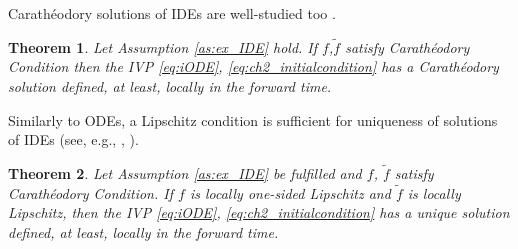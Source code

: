 \documentclass{article}
\newtheorem{theorem}{Theorem}
\begin{document}
Carath\'{e}odory solutions of IDEs are well-studied too \cite{OReganMeehan1998:Book}.
\begin{theorem}\label{thm:Caratheodory_iODE}\itshape
	Let Assumption \ref{as:ex_IDE} hold.  If  $f$,$\tilde f$ satisfy 
		Carath\'{e}\-odory  Condition then the IVP \eqref{eq:iODE}, \eqref{eq:ch2_initialcondition} has a Carath\'{e}\-odory  solution defined, at least, locally in the forward time.
\end{theorem}

Similarly to ODEs, a Lipschitz condition  is sufficient for uniqueness of solutions of IDEs (see, e.g., \cite{Lakshmikantham_etal1995:Book}, \cite{OReganMeehan1998:Book}).
\begin{theorem} \itshape \label{thm:uniqness_iODE} 	Let Assumption \ref{as:ex_IDE} be fulfilled and $f$, $\tilde f$ satisfy 
	Carath\'{e}\-odory  Condition. If $f$ is locally one-sided  Lipschitz  and $\tilde f$ is locally Lipschitz, then
  the IVP \eqref{eq:iODE}, \eqref{eq:ch2_initialcondition} has a  unique solution defined, at least, locally in the forward time. 
\end{theorem}	
\vspace{-2mm}
\end{document}
